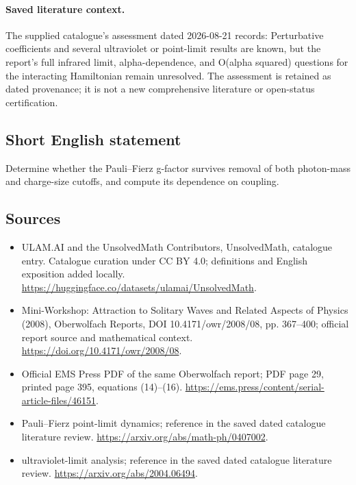 \documentclass[11pt]{article}
\begin{document}
\paragraph{Saved literature context.} The supplied catalogue's assessment dated 2026-08-21 records: Perturbative coefficients and several ultraviolet or point-limit results are known, but the report's full infrared limit, alpha-dependence, and O(alpha squared) questions for the interacting Hamiltonian remain unresolved. The assessment is retained as dated provenance; it is not a new comprehensive literature or open-status certification.
\subsection{Short English statement}
Determine whether the Pauli--Fierz g-factor survives removal of both photon-mass and charge-size cutoffs, and compute its dependence on coupling.
\subsection{Sources}
\begin{itemize}
\item[\hypertarget{source:statement:1}{S1}] ULAM.AI and the UnsolvedMath Contributors, UnsolvedMath, catalogue entry. Catalogue curation under CC BY 4.0; definitions and English exposition added locally.
\url{https://huggingface.co/datasets/ulamai/UnsolvedMath}.
\item[\hypertarget{source:statement:2}{S2}] Mini-Workshop: Attraction to Solitary Waves and Related Aspects of Physics (2008), Oberwolfach Reports, DOI 10.4171/owr/2008/08, pp. 367--400; official report source and mathematical context.
\url{https://doi.org/10.4171/owr/2008/08}.
\item[\hypertarget{source:statement:3}{S3}] Official EMS Press PDF of the same Oberwolfach report; PDF page 29, printed page 395, equations (14)--(16).
\url{https://ems.press/content/serial-article-files/46151}.
\item[\hypertarget{source:statement:4}{S4}] Pauli--Fierz point-limit dynamics; reference in the saved dated catalogue literature review.
\url{https://arxiv.org/abs/math-ph/0407002}.
\item[\hypertarget{source:statement:5}{S5}] ultraviolet-limit analysis; reference in the saved dated catalogue literature review.
\url{https://arxiv.org/abs/2004.06494}.
\end{itemize}
\label{end:statement}
\end{document}
